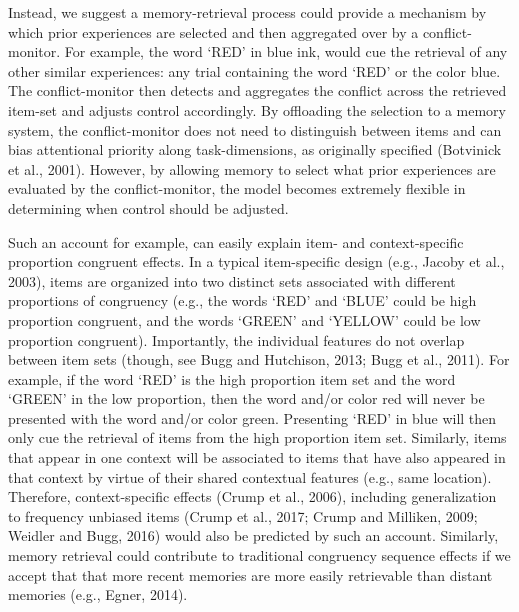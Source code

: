 \documentclass[]{DissertateCUNY}
\begin{document}
Instead, we suggest a memory-retrieval process could provide a mechanism
by which prior experiences are selected and then aggregated over by a
conflict-monitor. For example, the word `RED' in blue ink, would cue the
retrieval of any other similar experiences: any trial containing the
word `RED' or the color blue. The conflict-monitor then detects and
aggregates the conflict across the retrieved item-set and adjusts
control accordingly. By offloading the selection to a memory system, the
conflict-monitor does not need to distinguish between items and can bias
attentional priority along task-dimensions, as originally specified
(Botvinick et al., 2001). However, by allowing memory to select what
prior experiences are evaluated by the conflict-monitor, the model
becomes extremely flexible in determining when control should be
adjusted.

Such an account for example, can easily explain item- and
context-specific proportion congruent effects. In a typical
item-specific design (e.g., Jacoby et al., 2003), items are organized
into two distinct sets associated with different proportions of
congruency (e.g., the words `RED' and `BLUE' could be high proportion
congruent, and the words `GREEN' and `YELLOW' could be low proportion
congruent). Importantly, the individual features do not overlap between
item sets (though, see Bugg and Hutchison, 2013; Bugg et al., 2011). For
example, if the word `RED' is the high proportion item set and the word
`GREEN' in the low proportion, then the word and/or color red will never
be presented with the word and/or color green. Presenting `RED' in blue
will then only cue the retrieval of items from the high proportion item
set. Similarly, items that appear in one context will be associated to
items that have also appeared in that context by virtue of their shared
contextual features (e.g., same location). Therefore, context-specific
effects (Crump et al., 2006), including generalization to frequency
unbiased items (Crump et al., 2017; Crump and Milliken, 2009; Weidler
and Bugg, 2016) would also be predicted by such an account. Similarly,
memory retrieval could contribute to traditional congruency sequence
effects if we accept that that more recent memories are more easily
retrievable than distant memories (e.g., Egner, 2014).
\end{document}
